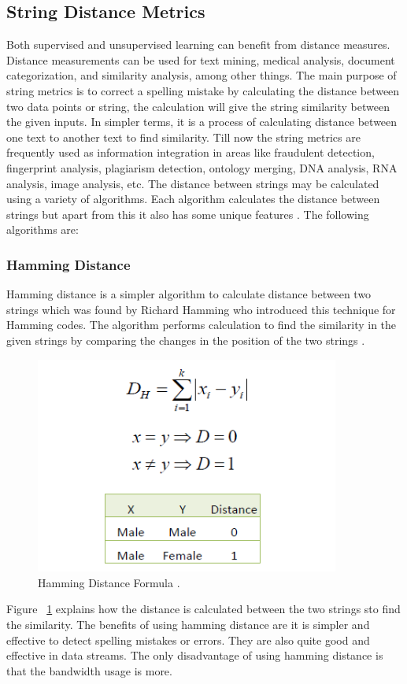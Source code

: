 \subsection{String Distance Metrics}
Both supervised and unsupervised learning can benefit from distance measures. Distance measurements can be used for text mining, medical analysis, document categorization, and similarity analysis, among other things. The main purpose of string metrics is to correct a spelling mistake by calculating the distance between two data points or string, the calculation will give the string similarity between the given inputs. In simpler terms, it is a process of calculating distance between one text to another text to find similarity. Till now the string metrics are frequently used as information integration in areas like fraudulent detection, fingerprint analysis, plagiarism detection, ontology merging, DNA analysis, RNA analysis, image analysis, etc. The distance between strings may be calculated using a variety of algorithms. Each algorithm calculates the distance between strings but apart from this it also has some unique features \cite{Wu2020}. The following algorithms are:
\subsubsection{Hamming Distance}
Hamming distance is a simpler algorithm to calculate distance between two strings which was found by Richard Hamming who introduced this technique for Hamming codes. The algorithm performs  calculation to find the similarity in the given strings by comparing the changes in the position of the two strings \cite{Tok2015}.

\newpage
\begin{figure}[h!]
	\includegraphics[width=10cm]{includes/hamming.png}
	\centering
	\caption{ Hamming Distance Formula \cite{Saed2021}.}
	\label{fig:hamming}
\end{figure}
Figure ~\ref{fig:hamming} explains how the distance is calculated between the two strings sto find the similarity. The benefits of using hamming distance are it is simpler and effective to detect spelling mistakes or errors. They are also quite good and effective in data streams. The only disadvantage of using hamming distance is that the bandwidth usage is more.
